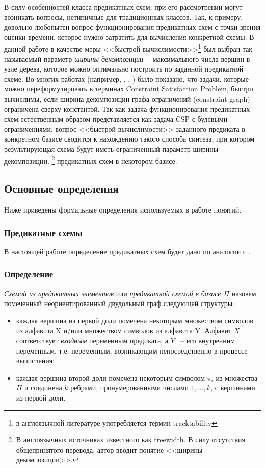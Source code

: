 \documentclass[12pt]{article}
\begin{document}
В силу особенностей класса предикатных схем, при его рассмотрении могут возникать вопросы,
нетипичные для традиционных классов. Так, к примеру, довольно любопытен вопрос функционирования предикатных схем с точки зрения оценки времени, которое нужно затратить для
вычисления конкретной схемы. 
В данной работе в качестве меры <<быстрой вычислимости>>\footnote{в англоязычной литературе употребляется термин tracktability}
 был выбран так называемый параметр \textit{ширины декомпозиции}~-- максимального числа вершин в узле дерева, 
которое можно оптимально построить по заданной предикатной схеме. Во многих работах (например, \cite{CSP10}, \cite{Gott10}, \cite{Prosc89}) было 
показано, что задачи, которые можно переформулировать в терминах Constraint Satisfaction Problem, быстро вычислимы, если ширина декомпозиции графа ограничений 
(constraint graph) ограничена сверху константой. Так как задача функционирования предикатных схем естественным образом представляется как задача CSP с булевыми ограничениями,
 вопрос <<быстрой вычислимости>> заданного предиката в конкретном базисе сводится к нахождению такого способа синтеза, при котором результирующая схема будут 
иметь ограниченный параметр ширины декомпозиции.
\footnote
{В англоязычных источниках известного как treewidth. В силу отсутствия общепринятого перевода, автор вводит 
понятие <<ширины декомпозиции>>.} предикатных схем в некотором базисе.

\subsection{Основные определения}
Ниже приведены формальные определения используемых в работе понятий.

\subsubsection{Предикатные схемы}

В настоящей работе определение предикатных схем будет дано по аналогии с \cite{Shu11}.

\subsubsection*{Определение}

\textit{Схемой из предикатных элементов} или \textit{предикатной схемой в базисе $\Pi$} назовем помеченный
неориентированный двудольный граф следующей структуры:

\begin{itemize}
\item каждая вершина из первой доли помечена некоторым множеством символов из алфавита X и/или 
множеством символов из алфавита Y. Алфавит $X$ соответствует \textit{входным} переменным предиката, а $Y$ ~-- его внутренним переменным, 
т.е. переменным, возникающим непосредственно в процессе вычисления; 

\item каждая вершина второй доли помечена некоторым символом $\pi_i$ из множества $\Pi$ и 
соединена $k$ ребрами, пронумерованными числами $1, ..., k$, с вершинами из первой доли.
\end{itemize}
\end{document}
